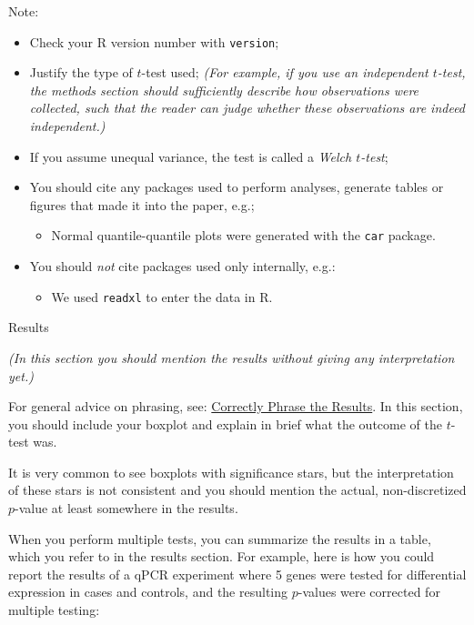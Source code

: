 \documentclass[
]{book}
\providecommand{\tightlist}{%
  \setlength{\itemsep}{0pt}\setlength{\parskip}{0pt}}
\begin{document}
Note:

\begin{itemize}
\tightlist
\item
  Check your R version number with \texttt{version};
\item
  Justify the type of \(t\)-test used; \emph{(For example, if you use an independent \(t\)-test, the methods section should sufficiently describe how observations were collected, such that the reader can judge whether these observations are indeed independent.)}
\item
  If you assume unequal variance, the test is called a \emph{Welch \(t\)-test};
\item
  You should cite any packages used to perform analyses, generate tables or figures that made it into the paper, e.g.;

  \begin{itemize}
  \tightlist
  \item
    Normal quantile-quantile plots were generated with the \texttt{car} package.\citep{car}
  \end{itemize}
\item
  You should \emph{not} cite packages used only internally, e.g.:

  \begin{itemize}
  \tightlist
  \item
    We used \texttt{readxl} to enter the data in R.\citep{readxl}
  \end{itemize}
\end{itemize}

Results

\emph{(In this section you should mention the results without giving any interpretation yet.)}

For general advice on phrasing, see: \protect\hyperlink{results-t}{Correctly Phrase the Results}. In this section, you should include your boxplot and explain in brief what the outcome of the \(t\)-test was.

It is very common to see boxplots with significance stars, but the interpretation of these stars is not consistent and you should mention the actual, non-discretized \(p\)-value at least somewhere in the results.

When you perform multiple tests, you can summarize the results in a table, which you refer to in the results section. For example, here is how you could report the results of a qPCR experiment where 5 genes were tested for differential expression in cases and controls, and the resulting \(p\)-values were corrected for multiple testing:
\end{document}
